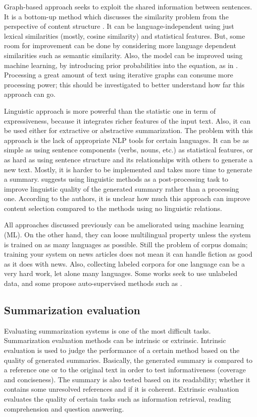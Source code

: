 \documentclass[12pt, oneside, a4paper]{article}
\begin{document}
Graph-based approach seeks to exploit the shared information between sentences. 
It is a bottom-up method which discusses the similarity problem from the perspective of content structure \citep{15-yang-al}. 
It can be language-independent using just lexical similarities (mostly, cosine similarity) and statistical features. 
But, some room for improvement can be done by considering more language dependent similarities such as semantic similarity. 
Also, the model can be improved using machine learning, by introducing prior probabilities into the equation, as in \citep{08-liu-al}.
Processing a great amount of text using iterative graphs can consume more processing power; this should be investigated to better understand how far this approach can go.

Linguistic approach is more powerful than the statistic one in term of expressiveness, because it integrates richer features of the input text. 
Also, it can be used either for extractive or abstractive summarization.  
The problem with this approach is the lack of appropriate NLP tools for certain languages. 
It can be as simple as using sentence components (verbs, nouns, etc.) as statistical features, or as hard as using sentence structure and its relationships with others to generate a new text. 
Mostly, it is harder to be implemented and takes more time to generate a summary. 
\citet{11-nenkova-mckeown} suggests using linguistic methods as a post-processing task to improve linguistic quality of the generated summary rather than a processing one.
According to the authors, it is unclear how much this approach can improve content selection compared to the methods using no linguistic relations. 

All approaches discussed previously can be ameliorated using machine learning (ML).
On the other hand, they can loose multilingual property unless the system is trained on as many languages as possible. 
Still the problem of corpus domain; training your system on news articles does not mean it can handle fiction as good as it does with news.
Also, collecting labeled corpora for one language can be a very hard work, let alone many languages. 
Some works seek to use unlabeled data, and some propose auto-supervised methods such as \citep{02-amini-gallinari}.

\subsection{Summarization evaluation}

Evaluating summarization systems is one of the most difficult tasks. 
Summarization evaluation methods can be intrinsic or extrinsic. 
Intrinsic evaluation is used to judge the performance of a certain method based on the quality of generated summaries.
Basically, the generated summary is compared to a reference one or to the original text in order to test informativeness (coverage and conciseness). 
The summary is also tested based on its readability; whether it contains some unresolved references and if it is coherent.
Extrinsic evaluation evaluates the quality of certain tasks such as information retrieval, reading comprehension and question answering.
\end{document}
